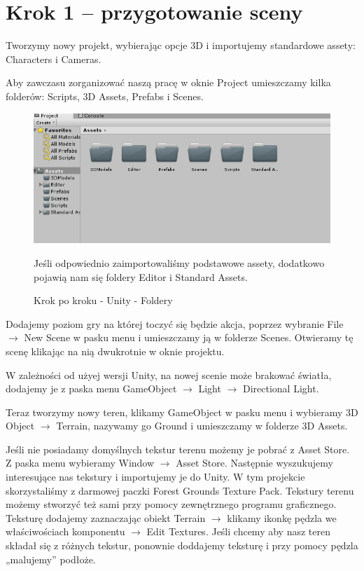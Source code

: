 \documentclass[openright]{xmgr}
\begin{document}
\section{Krok 1 – przygotowanie sceny}


Tworzymy nowy projekt, wybierając opcje 3D i importujemy standardowe assety: Characters i Cameras.

Aby zawczasu zorganizować naszą pracę w oknie Project umieszczamy kilka folderów: Scripts, 3D Assets, Prefabs  i Scenes.

\begin{figure}[!htb]
    \begin{center}
    \includegraphics[scale=0.25]{Screeny/UnityKrokPoKroku/foldery}
    \end{center}
    \caption{Krok po kroku - Unity - Foldery}
Jeśli odpowiednio zaimportowaliśmy podstawowe assety, dodatkowo pojawią nam się foldery Editor i Standard Assets.
\end{figure}

Dodajemy poziom gry na której toczyć się będzie akcja, poprzez wybranie File $\rightarrow$ New Scene w pasku menu i umieszczamy ją w folderze Scenes. Otwieramy tę scenę klikając na nią dwukrotnie w oknie projektu.

W zależności od użyej wersji Unity, na nowej scenie może brakować światła, dodajemy je z paska menu GameObject $\rightarrow$ Light $\rightarrow$ Directional Light.

Teraz tworzymy nowy teren, klikamy GameObject w pasku menu i wybieramy 3D Object $\rightarrow$ Terrain, nazywamy go Ground i umieszczamy w folderze 3D Assets.

Jeśli nie posiadamy domyślnych tekstur terenu możemy je pobrać z Asset Store. Z paska menu wybieramy Window $\rightarrow$ Asset Store. Następnie wyszukujemy interesujące nas tekstury i importujemy je do Unity. W tym projekcie skorzystaliśmy z darmowej paczki Forest Grounds Texture Pack. Tekstury terenu możemy stworzyć też sami przy pomocy zewnętrznego programu graficznego. Teksturę dodajemy zaznaczając obiekt Terrain $\rightarrow$ klikamy ikonkę pędzla we właściwościach komponentu $\rightarrow$ Edit Textures. Jeśli chcemy aby nasz teren składał się z różnych tekstur, ponownie doddajemy teksturę i przy pomocy pędzla „malujemy” podłoże.
\end{document}
